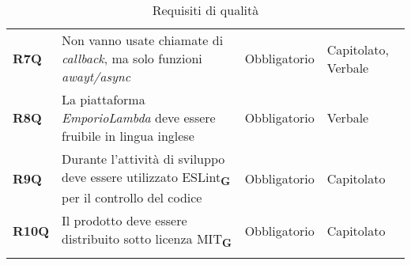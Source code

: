 \begin{center}
\begin{longtable}[!h]{p{50px} p{200px} p{100px} p{50px}}
        \textbf{R7Q}                          & Non vanno usate chiamate di \textit{callback}, ma solo funzioni \textit{awayt/async}                                                                                 & Obbligatorio             & Capitolato, Verbale     \\
        \textbf{R8Q}                          & La piattaforma \textit{EmporioLambda} deve essere fruibile in lingua inglese                                                                                         & Obbligatorio             & Verbale \\
        \textbf{R9Q}                          & Durante l'attività di sviluppo deve essere utilizzato ESLint\textsubscript{\textbf{G}} per il controllo del codice                                                                             & Obbligatorio             & Capitolato \\
        \textbf{R10Q}                         & Il prodotto deve essere distribuito sotto licenza MIT\textsubscript{\textbf{G}}                                                                                      & Obbligatorio             & Capitolato \\
        \rowcolor{white}\caption{Requisiti di qualità}
    \end{longtable}
\end{center}

\newpage
